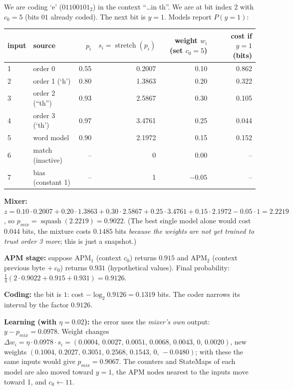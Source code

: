 \documentclass[11pt,a4paper,openany]{book}
\newcommand{\st}{\operatorname{stretch}}
\newcommand{\sq}{\operatorname{squash}}
\theoremstyle{definition}
\theoremstyle{remark}
\begin{document}
\begin{example}
We are coding `e' ($01100101_2$) in the context ``\ldots{}in th''. We are at bit index 2 with $c_0=5$ (bits $01$ already coded). The next bit is $y=1$. Models report $P(y=1)$:
\begin{center}
\begin{tabular}{@{}llrrrr@{}}
\toprule
input & source & $p_i$ & $s_i=\st(p_i)$ & weight $w_i$ (set $c_0{=}5$) & cost if $y{=}1$ (bits)\\
\midrule
1 & order 0 & 0.55 & 0.2007 & 0.10 & 0.862\\
2 & order 1 (`h') & 0.80 & 1.3863 & 0.20 & 0.322\\
3 & order 2 (``th'') & 0.93 & 2.5867 & 0.30 & 0.105\\
4 & order 3 (`\textvisiblespace th') & 0.97 & 3.4761 & 0.25 & 0.044\\
5 & word model & 0.90 & 2.1972 & 0.15 & 0.152\\
6 & match (inactive) & -- & 0 & 0.00 & --\\
7 & bias (constant 1) & -- & 1 & $-0.05$ & --\\
\bottomrule
\end{tabular}
\end{center}
\textbf{Mixer:} $z=0.10\cdot0.2007+0.20\cdot1.3863+0.30\cdot2.5867+0.25\cdot3.4761+0.15\cdot2.1972-0.05\cdot1=2.2219$, so $p_{mix}=\sq(2.2219)=0.9022$. (The best single model alone would cost $0.044$ bits, the mixture costs $0.1485$ bits \emph{because the weights are not yet trained to trust order 3 more}; this is just a snapshot.)

\textbf{APM stage:} suppose APM$_1$ (context $c_0$) returns $0.915$ and APM$_2$ (context previous byte $+\ c_0$) returns $0.931$ (hypothetical values). Final probability: $\tfrac14(2\cdot0.9022+0.915+0.931)=0.9126$.

\textbf{Coding:} the bit is $1$: cost $-\log_2 0.9126=0.1319$ bits. The coder narrows its interval by the factor $0.9126$.

\textbf{Learning (with $\eta=0.02$):} the error uses the \emph{mixer's own} output: $y-p_{mix}=0.0978$. Weight changes $\Delta w_i=\eta\cdot0.0978\cdot s_i=(0.0004,\,0.0027,\,0.0051,\,0.0068,\,0.0043,\,0,\,0.0020)$, new weights $(0.1004,\,0.2027,\,0.3051,\,0.2568,\,0.1543,\,0,\,-0.0480)$; with these the same inputs would give $p_{mix}=0.9067$. The counters and StateMaps of each model are also moved toward $y=1$, the APM nodes nearest to the inputs move toward 1, and $c_0\leftarrow 11$.
\end{example}
\end{document}
